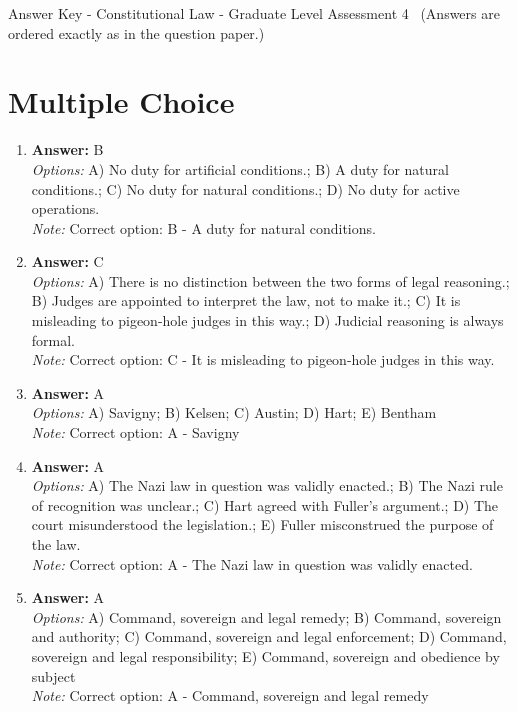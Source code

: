 \documentclass[12pt]{article}
\begin{document}
\begin{center}
Answer Key - Constitutional Law - Graduate Level Assessment 4 \
\small (Answers are ordered exactly as in the question paper.)
\end{center}

\section*{Multiple Choice}
\begin{enumerate}[label=\arabic*.]
\item \textbf{Answer:} B
\\ \textit{Options:} A) No duty for artificial conditions.; B) A duty for natural conditions.; C) No duty for natural conditions.; D) No duty for active operations.
\\ \textit{Note:} Correct option: B - A duty for natural conditions.
\item \textbf{Answer:} C
\\ \textit{Options:} A) There is no distinction between the two forms of legal reasoning.; B) Judges are appointed to interpret the law, not to make it.; C) It is misleading to pigeon-hole judges in this way.; D) Judicial reasoning is always formal.
\\ \textit{Note:} Correct option: C - It is misleading to pigeon-hole judges in this way.
\item \textbf{Answer:} A
\\ \textit{Options:} A) Savigny; B) Kelsen; C) Austin; D) Hart; E) Bentham
\\ \textit{Note:} Correct option: A - Savigny
\item \textbf{Answer:} A
\\ \textit{Options:} A) The Nazi law in question was validly enacted.; B) The Nazi rule of recognition was unclear.; C) Hart agreed with Fuller's argument.; D) The court misunderstood the legislation.; E) Fuller misconstrued the purpose of the law.
\\ \textit{Note:} Correct option: A - The Nazi law in question was validly enacted.
\item \textbf{Answer:} A
\\ \textit{Options:} A) Command, sovereign and legal remedy; B) Command, sovereign and authority; C) Command, sovereign and legal enforcement; D) Command, sovereign and legal responsibility; E) Command, sovereign and obedience by subject
\\ \textit{Note:} Correct option: A - Command, sovereign and legal remedy
\end{enumerate}
\end{document}
